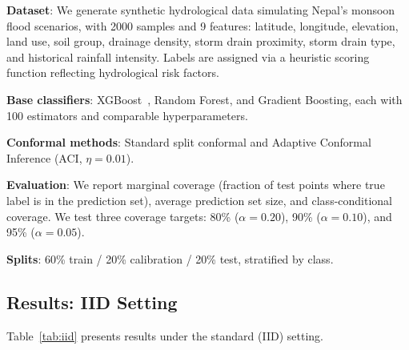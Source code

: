 \documentclass{article}
\begin{document}
\textbf{Dataset}: We generate synthetic hydrological data simulating Nepal's monsoon flood scenarios, with 2000 samples and 9 features: latitude, longitude, elevation, land use, soil group, drainage density, storm drain proximity, storm drain type, and historical rainfall intensity. Labels are assigned via a heuristic scoring function reflecting hydrological risk factors.

\textbf{Base classifiers}: XGBoost~\cite{xgboost2016}, Random Forest, and Gradient Boosting, each with 100 estimators and comparable hyperparameters.

\textbf{Conformal methods}: Standard split conformal and Adaptive Conformal Inference (ACI, $\eta=0.01$).

\textbf{Evaluation}: We report marginal coverage (fraction of test points where true label is in the prediction set), average prediction set size, and class-conditional coverage. We test three coverage targets: 80\% ($\alpha=0.20$), 90\% ($\alpha=0.10$), and 95\% ($\alpha=0.05$).

\textbf{Splits}: 60\% train / 20\% calibration / 20\% test, stratified by class.

\subsection{Results: IID Setting}

Table~\ref{tab:iid} presents results under the standard (IID) setting.
\end{document}

